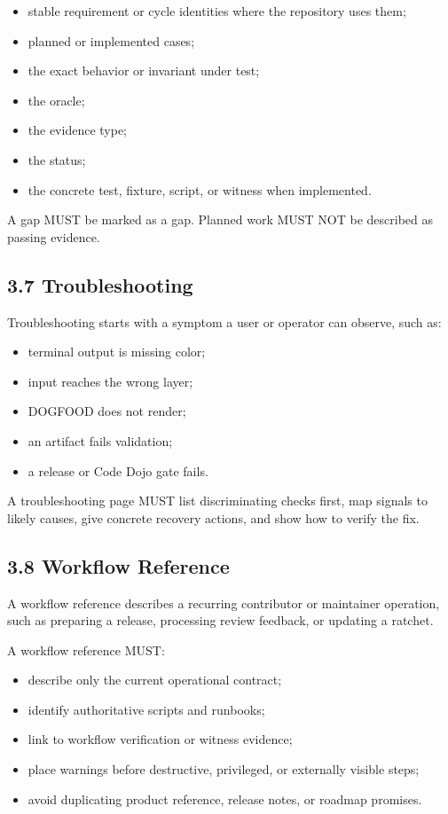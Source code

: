 \begin{itemize}
\tightlist
\item
  stable requirement or cycle identities where the repository uses them;
\item
  planned or implemented cases;
\item
  the exact behavior or invariant under test;
\item
  the oracle;
\item
  the evidence type;
\item
  the status;
\item
  the concrete test, fixture, script, or witness when implemented.
\end{itemize}

A gap MUST be marked as a gap. Planned work MUST NOT be described as passing evidence.

\subsection{3.7 Troubleshooting}\label{record-005-troubleshooting}

Troubleshooting starts with a symptom a user or operator can observe, such as:

\begin{itemize}
\tightlist
\item
  terminal output is missing color;
\item
  input reaches the wrong layer;
\item
  DOGFOOD does not render;
\item
  an artifact fails validation;
\item
  a release or Code Dojo gate fails.
\end{itemize}

A troubleshooting page MUST list discriminating checks first, map signals to likely causes, give concrete recovery actions, and show how to verify the fix.

\subsection{3.8 Workflow Reference}\label{record-005-workflow-reference}

A workflow reference describes a recurring contributor or maintainer operation, such as preparing a release, processing review feedback, or updating a ratchet.

A workflow reference MUST:

\begin{itemize}
\tightlist
\item
  describe only the current operational contract;
\item
  identify authoritative scripts and runbooks;
\item
  link to workflow verification or witness evidence;
\item
  place warnings before destructive, privileged, or externally visible steps;
\item
  avoid duplicating product reference, release notes, or roadmap promises.
\end{itemize}


